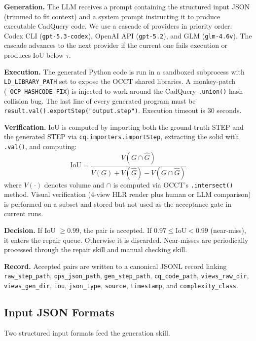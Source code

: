 \noindent\textbf{Generation.}
The LLM receives a prompt containing the structured input JSON (trimmed to fit context) and a system prompt instructing it to produce executable CadQuery code. We use a cascade of providers in priority order: Codex CLI (\texttt{gpt-5.3-codex}), OpenAI API (\texttt{gpt-5.2}), and GLM (\texttt{glm-4.6v}). The cascade advances to the next provider if the current one fails execution or produces IoU below $\tau$.

\noindent\textbf{Execution.}
The generated Python code is run in a sandboxed subprocess with \texttt{LD\_LIBRARY\_PATH} set to expose the OCCT shared libraries. A monkey-patch (\texttt{\_OCP\_HASHCODE\_FIX}) is injected to work around the CadQuery \texttt{.union()} hash collision bug. The last line of every generated program must be \texttt{result.val().exportStep("output.step")}. Execution timeout is 30 seconds.

\noindent\textbf{Verification.}
IoU is computed by importing both the ground-truth STEP and the generated STEP via \texttt{cq.importers.importStep}, extracting the solid with \texttt{.val()}, and computing:
\begin{equation}
\text{IoU} = \frac{V(G \cap \hat{G})}{V(G) + V(\hat{G}) - V(G \cap \hat{G})}
\end{equation}
where $V(\cdot)$ denotes volume and $\cap$ is computed via OCCT's \texttt{.intersect()} method. Visual verification (4-view HLR render plus human or LLM comparison) is performed on a subset and stored but not used as the acceptance gate in current runs.

\noindent\textbf{Decision.}
If IoU $\geq 0.99$, the pair is accepted. If $0.97 \leq \text{IoU} < 0.99$ (near-miss), it enters the repair queue. Otherwise it is discarded. Near-misses are periodically processed through the repair skill and manual checking skill.

\noindent\textbf{Record.}
Accepted pairs are written to a canonical JSONL record linking \texttt{raw\_step\_path}, \texttt{ops\_json\_path}, \texttt{gen\_step\_path}, \texttt{cq\_code\_path}, \texttt{views\_raw\_dir}, \texttt{views\_gen\_dir}, \texttt{iou}, \texttt{json\_type}, \texttt{source}, \texttt{timestamp}, and \texttt{complexity\_class}.

\subsection{Input JSON Formats}

Two structured input formats feed the generation skill.

